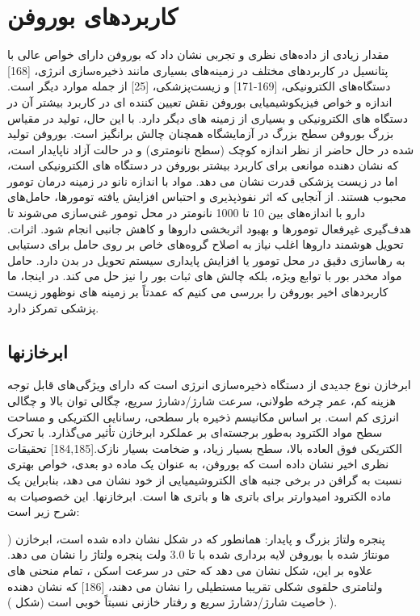 \section{کاربردهای بوروفن}
مقدار زیادی از داده‌های نظری و تجربی نشان داد که بوروفن دارای خواص عالی با پتانسیل در کاربردهای مختلف در زمینه‌های بسیاری مانند ذخیره‌سازی انرژی، [168] دستگاه‌های الکترونیکی، [169-171] و زیست‌پزشکی، [25] از جمله موارد دیگر است. اندازه و خواص فیزیکوشیمیایی بوروفن نقش تعیین کننده ای در کاربرد بیشتر آن در دستگاه های الکترونیکی و بسیاری از زمینه های دیگر دارد. با این حال، تولید در مقیاس بزرگ بوروفن سطح بزرگ در آزمایشگاه همچنان چالش برانگیز است. بوروفن تولید شده در حال حاضر از نظر اندازه کوچک (سطح نانومتری) و در حالت آزاد ناپایدار است، که نشان دهنده موانعی برای کاربرد بیشتر بوروفن در دستگاه های الکترونیکی است، اما در زیست پزشکی قدرت نشان می دهد. مواد با اندازه نانو در زمینه درمان تومور محبوب هستند. از آنجایی که اثر نفوذپذیری و احتباس  افزایش یافته تومورها، حامل‌های دارو با اندازه‌های بین 10 تا 1000 نانومتر در محل تومور غنی‌سازی می‌شوند تا هدف‌گیری غیرفعال تومورها و بهبود اثربخشی داروها و کاهش جانبی انجام شود. اثرات. تحویل هوشمند داروها اغلب نیاز به اصلاح گروه‌های خاص بر روی حامل برای دستیابی به رهاسازی دقیق در محل تومور یا افزایش پایداری سیستم تحویل در بدن دارد. حامل مواد مخدر بور با توابع ویژه، بلکه چالش های ثبات بور را نیز حل می کند. در اینجا، ما کاربردهای اخیر بوروفن را بررسی می کنیم که عمدتاً بر زمینه های نوظهور زیست پزشکی تمرکز دارد.
\subsection{ابرخازنها}
ابرخازن نوع جدیدی از دستگاه ذخیره‌سازی انرژی است که دارای ویژگی‌های قابل توجه هزینه کم، عمر چرخه طولانی، سرعت شارژ/دشارژ سریع، چگالی توان بالا و چگالی انرژی کم است. بر اساس مکانیسم ذخیره بار سطحی، رسانایی الکتریکی و مساحت سطح مواد الکترود به‌طور برجسته‌ای بر عملکرد ابرخازن تأثیر می‌گذارد. با تحرک الکتریکی فوق العاده بالا، سطح بسیار زیاد، و ضخامت بسیار نازک.[184,185] تحقیقات نظری اخیر نشان داده است که بوروفن، به عنوان یک ماده دو بعدی، خواص بهتری نسبت به گرافن در برخی جنبه های الکتروشیمیایی از خود نشان می دهد، بنابراین یک ماده الکترود امیدوارتر برای باتری ها و باتری ها است. ابرخازنها. این خصوصیات به شرح زیر است: 

) پنجره ولتاژ بزرگ و پایدار: همانطور که در شکل  نشان داده شده است، ابرخازن مونتاژ شده با بوروفن لایه برداری شده با  تا 3.0 ولت پنجره ولتاژ را نشان می دهد. علاوه بر این، شکل  نشان می دهد که حتی در سرعت اسکن ، تمام منحنی های ولتامتری حلقوی شکلی تقریبا مستطیلی را نشان می دهند، [186] که نشان دهنده خاصیت شارژ/دشارژ سریع و رفتار خازنی نسبتاً خوبی است (شکل ) ). 

